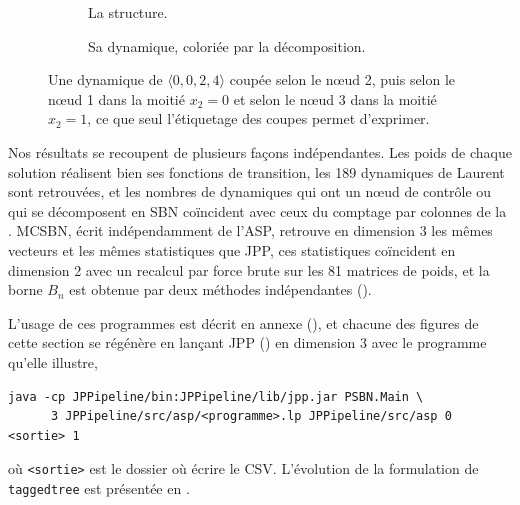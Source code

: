 \documentclass[12pt, a4paper]{article}
\begin{document}
\begin{figure}[H]
    \centering
    \begin{subfigure}{0.48\linewidth}
        \centering
        \caption{La structure.}
    \end{subfigure}
    \hfill
    \begin{subfigure}{0.48\linewidth}
        \centering
        \caption{Sa dynamique, coloriée par la décomposition.}
    \end{subfigure}
    \caption{Une dynamique de $\langle 0,0,2,4\rangle$ coupée selon le nœud 2, puis selon le nœud 1 dans la moitié $x_2 = 0$ et selon le nœud 3 dans la moitié $x_2 = 1$, ce que seul l'étiquetage des coupes permet d'exprimer.}
    \label{fig:taggedtree}
\end{figure}

Nos résultats se recoupent de plusieurs façons indépendantes.
Les poids de chaque solution réalisent bien ses fonctions de transition, les 189 dynamiques de Laurent sont retrouvées, et les nombres de dynamiques qui ont un nœud de contrôle ou qui se décomposent en SBN coïncident avec ceux du comptage par colonnes de la .
MCSBN, écrit indépendamment de l'ASP, retrouve en dimension 3 les mêmes vecteurs et les mêmes statistiques que JPP, ces statistiques coïncident en dimension 2 avec un recalcul par force brute sur les 81 matrices de poids, et la borne $B_n$ est obtenue par deux méthodes indépendantes ().

L'usage de ces programmes est décrit en annexe (), et chacune des figures de cette section se régénère en lançant JPP () en dimension 3 avec le programme qu'elle illustre,
\begin{verbatim}
java -cp JPPipeline/bin:JPPipeline/lib/jpp.jar PSBN.Main \
      3 JPPipeline/src/asp/<programme>.lp JPPipeline/src/asp 0 <sortie> 1
\end{verbatim}
où \texttt{<sortie>} est le dossier où écrire le CSV.
L'évolution de la formulation de \texttt{taggedtree} est présentée en .
\end{document}
